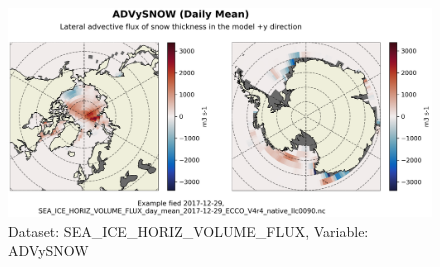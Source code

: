 \begin{figure}[H]
\centering
\includegraphics[scale=0.55]{../images/plots/native_plots/Sea-Ice_and_Snow_Horizontal_Volume_Fluxes/ADVySNOW.png}
\caption{Dataset: SEA\_ICE\_HORIZ\_VOLUME\_FLUX, Variable: ADVySNOW}
\label{tab:table-SEA_ICE_HORIZ_VOLUME_FLUX_ADVySNOW-Plot}
\end{figure}
\pagebreak
